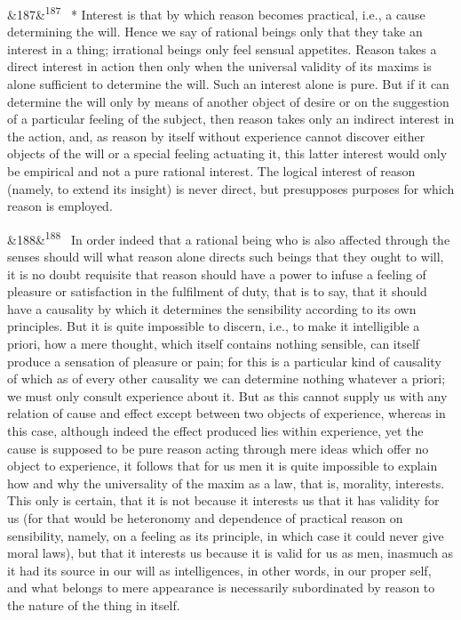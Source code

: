 \documentclass[12pt]{article}
\newcommand{\para}[1][]{\par\noindent\ifx&#1&\else\textsuperscript{\footnotesize #1}~\fi}
\begin{document}
\para[187] * Interest is that by which reason becomes practical, i.e., a cause determining the will. Hence we say of rational beings only that they take an interest in a thing; irrational beings only feel sensual appetites. Reason takes a direct interest in action then only when the universal validity of its maxims is alone sufficient to determine the will. Such an interest alone is pure. But if it can determine the will only by means of another object of desire or on the suggestion of a particular feeling of the subject, then reason takes only an indirect interest in the action, and, as reason by itself without experience cannot discover either objects of the will or a special feeling actuating it, this latter interest would only be empirical and not a pure rational interest. The logical interest of reason (namely, to extend its insight) is never direct, but presupposes purposes for which reason is employed.

\para[188] In order indeed that a rational being who is also affected through the senses should will what reason alone directs such beings that they ought to will, it is no doubt requisite that reason should have a power to infuse a feeling of pleasure or satisfaction in the fulfilment of duty, that is to say, that it should have a causality by which it determines the sensibility according to its own principles. But it is quite impossible to discern, i.e., to make it intelligible a priori, how a mere thought, which itself contains nothing sensible, can itself produce a sensation of pleasure or pain; for this is a particular kind of causality of which as of every other causality we can determine nothing whatever a priori; we must only consult experience about it. But as this cannot supply us with any relation of cause and effect except between two objects of experience, whereas in this case, although indeed the effect produced lies within experience, yet the cause is supposed to be pure reason acting through mere ideas which offer no object to experience, it follows that for us men it is quite impossible to explain how and why the universality of the maxim as a law, that is, morality, interests. This only is certain, that it is not because it interests us that it has validity for us (for that would be heteronomy and dependence of practical reason on sensibility, namely, on a feeling as its principle, in which case it could never give moral laws), but that it interests us because it is valid for us as men, inasmuch as it had its source in our will as intelligences, in other words, in our proper self, and what belongs to mere appearance is necessarily subordinated by reason to the nature of the thing in itself.
\end{document}
